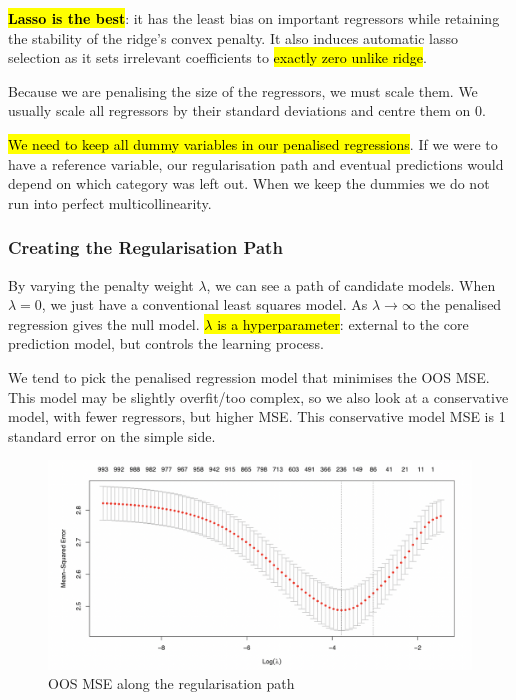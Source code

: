 \documentclass[11pt]{article}
\begin{document}
\begin{mdframed}
    \textbf{\hl{Lasso is the best}}: it has the least bias on important regressors while retaining the stability of the ridge's convex penalty. It also induces automatic lasso selection as it sets irrelevant coefficients to \hl{exactly zero unlike ridge}.
\end{mdframed}

Because we are penalising the size of the regressors, we must scale them. We usually scale all regressors by their standard deviations and centre them on 0.

\begin{note}
    \hl{We need to keep all dummy variables in our penalised regressions}. If we were to have a reference variable, our regularisation path and eventual predictions would depend on which category was left out. When we keep the dummies we do not run into perfect multicollinearity.
\end{note}

\subsubsection{Creating the Regularisation Path}

By varying the penalty weight $\lambda$, we can see a path of candidate models. When $\lambda = 0$, we just have a conventional least squares model. As $\lambda \rightarrow \infty$ the penalised regression gives the null model. \hl{$\lambda$ is a hyperparameter}: external to the core prediction model, but controls the learning process.

We tend to pick the penalised regression model that minimises the OOS MSE. This model may be slightly overfit/too complex, so we also look at a conservative model, with fewer regressors, but higher MSE. This conservative model MSE is 1 standard error on the simple side.

\begin{figure}[h]
    \centering
    \includegraphics[width=\textwidth]{pic/lasso mse.png}
    \caption{OOS MSE along the regularisation path}
    \label{fig:lasso mse}
\end{figure}
\end{document}
